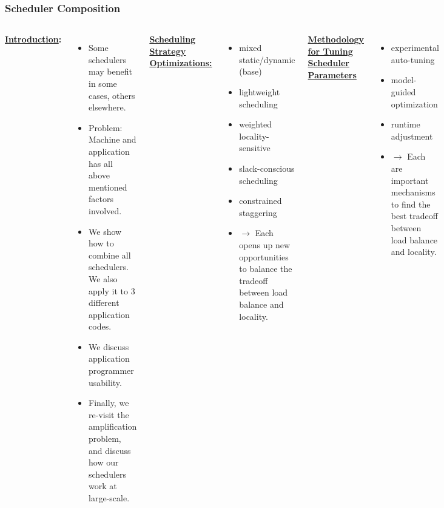 \begin{frame}[label=combinedintro]
\frametitle{Scheduler Composition}
\begin{columns}
{\small \textbf{\underline{Introduction}:}}\\
\begin{itemize}
\tiny \item \tiny Some schedulers may benefit in some cases, others elsewhere.
\item \tiny Problem: Machine and application has all above mentioned factors involved. 
\item \tiny We show how to combine all schedulers. We also apply it to 3 different application codes. 
\item \tiny We discuss application programmer usability. 
\item \tiny Finally, we re-visit the amplification problem, and discuss how our schedulers work at large-scale.
\end{itemize}

\vrule{}
 
{\tiny  \underline{\textbf{Scheduling Strategy Optimizations:}}}\\
\begin{itemize}
  \tiny \item \tiny mixed static/dynamic (base)
\item \tiny lightweight scheduling 
\item \tiny weighted locality-sensitive
\item \tiny slack-conscious scheduling
\item \tiny constrained staggering
\item \tiny $\rightarrow$ Each opens up new opportunities to balance the tradeoff between load balance and locality. %
\end{itemize}

{\tiny \underline{\textbf { Methodology for Tuning Scheduler Parameters}}}\\
\begin{itemize}
  \tiny \item \tiny experimental auto-tuning
\item \tiny model-guided optimization
\item \tiny runtime adjustment
\item \tiny $\rightarrow$ Each are important mechanisms to find the best tradeoff between load balance and locality.
\end{itemize}
\end{columns}
\end{frame}

